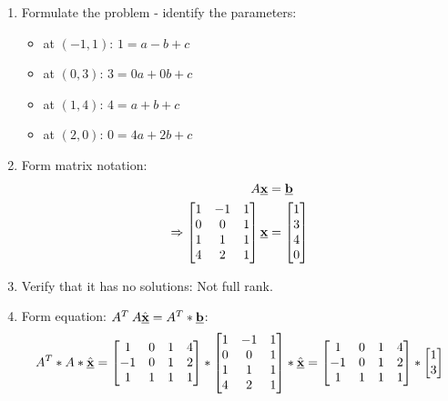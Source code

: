 \documentclass[10pt,a4paper]{article}
\begin{document}
\begin{enumerate}
	\item Formulate the problem - identify the parameters:
	\begin{itemize}
		\item at $(-1,1)$: $1=a-b+c$
		\item at $(0,3)$: $3=0a+0b+c$
		\item at $(1,4)$: $4=a+b+c$
		\item at $(2,0)$: $0=4a+2b+c$
	\end{itemize}
	\item Form matrix notation:
	\begin{align*}
		A \textbf{\underbar{x}} &= \textbf{\underbar{b}} \\
		\Rightarrow \begin{bmatrix}
			1&-1&1\\
			0&0&1\\
			1&1&1\\
			4&2&1
		\end{bmatrix}\textbf{\underbar{x}} &= \begin{bmatrix}
			1\\
			3\\
			4\\
			0
		\end{bmatrix}
	\end{align*}
	\item Verify that it has no solutions: Not full rank.
	\item Form equation: $A^T\:A\hat{\textbf{\underbar{x}}}=A^T*\textbf{\underbar{b}}$:
	$$A^T*A*\hat{\textbf{\underbar{x}}}=
	\begin{bmatrix}
		1&0&1&4\\
		-1&0&1&2\\
		1&1&1&1\\
	\end{bmatrix}*
	\begin{bmatrix}
		1&-1&1\\
		0&0&1\\
		1&1&1\\
		4&2&1
	\end{bmatrix}*\hat{\textbf{\underbar{x}}} = 
	\begin{bmatrix}
		1&0&1&4\\
		-1&0&1&2\\
		1&1&1&1\\
	\end{bmatrix}*\begin{bmatrix}
		1\\
		3\\

\end{bmatrix}$$
\end{enumerate}
\end{document}
